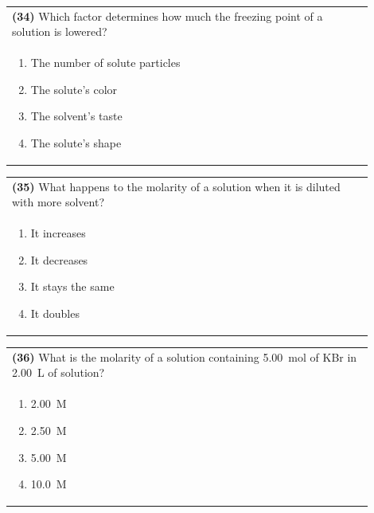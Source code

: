 \documentclass{article}
\begin{document}
\noindent\begin{tabular}{|p{0.9\linewidth}|}
\hline
\textbf{(34)} Which factor determines how much the freezing point of a solution is lowered?\\[0.2cm]
\begin{minipage}[t]{0.85\linewidth}
\begin{enumerate}[label=\alph*.]
\item The number of solute particles
\item The solute's color
\item The solvent's taste
\item The solute's shape
\end{enumerate}
\end{minipage}\\[0.2cm]
\hline
\end{tabular}

\noindent\begin{tabular}{|p{0.9\linewidth}|}
\hline
\textbf{(35)} What happens to the molarity of a solution when it is diluted with more solvent?\\[0.2cm]
\begin{minipage}[t]{0.85\linewidth}
\begin{enumerate}[label=\alph*.]
\item It increases
\item It decreases
\item It stays the same
\item It doubles
\end{enumerate}
\end{minipage}\\[0.2cm]
\hline
\end{tabular}

\noindent\begin{tabular}{|p{0.9\linewidth}|}
\hline
\textbf{(36)} What is the molarity of a solution containing 5.00~mol of KBr in 2.00~L of solution?\\[0.2cm]
\begin{minipage}[t]{0.85\linewidth}
\begin{enumerate}[label=\alph*.]
\item 2.00~M
\item 2.50~M
\item 5.00~M
\item 10.0~M
\end{enumerate}
\end{minipage}\\[0.2cm]
\hline
\end{tabular}
\end{document}
